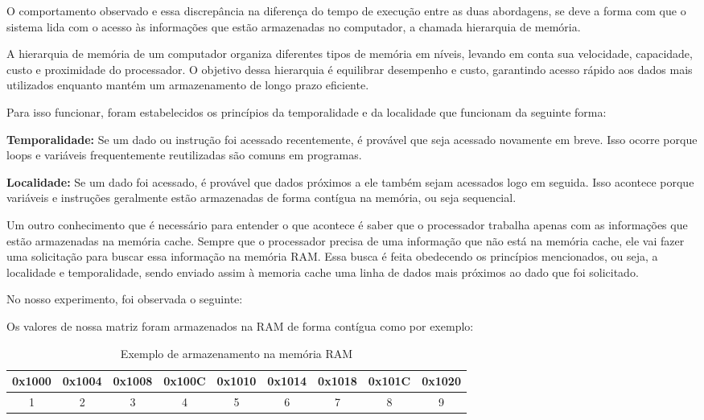 \documentclass[a4paper, 12pt]{article}
\begin{document}
	O comportamento observado e essa discrepância na diferença do tempo de execução entre as duas abordagens, se deve a forma com que o sistema lida com o acesso às informações que estão armazenadas no computador, a chamada hierarquia de memória.
	
	A hierarquia de memória de um computador organiza diferentes tipos de memória em níveis, levando em conta sua velocidade, capacidade, custo e proximidade do processador. O objetivo dessa hierarquia é equilibrar desempenho e custo, garantindo acesso rápido aos dados mais utilizados enquanto mantém um armazenamento de longo prazo eficiente.
	
	Para isso funcionar, foram estabelecidos os princípios da temporalidade e da localidade que funcionam da seguinte forma:
	
	
	\textbf{Temporalidade:} Se um dado ou instrução foi acessado recentemente, é provável que seja acessado novamente em breve. Isso ocorre porque loops e variáveis frequentemente reutilizadas são comuns em programas.
	
	\textbf{Localidade:} Se um dado foi acessado, é provável que dados próximos a ele também sejam acessados logo em seguida. Isso acontece porque variáveis e instruções geralmente estão armazenadas de forma contígua na memória, ou seja sequencial.
	
	
	Um outro conhecimento que é necessário para entender o que acontece é saber que o processador trabalha apenas com as informações que estão armazenadas na memória cache. Sempre que o processador precisa de uma informação que não está na memória cache, ele vai fazer uma solicitação para buscar essa informação na memória RAM. Essa busca é feita obedecendo os princípios mencionados, ou seja, a localidade e temporalidade, sendo enviado assim à memoria cache uma linha de dados mais próximos ao dado que foi solicitado.
	
	\vspace{0,5cm}
	
	No nosso experimento, foi observada o seguinte:
	
	\vspace{0,5cm}
	
	Os valores de nossa matriz foram armazenados na RAM de forma contígua como por exemplo:
	
	\begin{table}[ht]
	\centering
	    \begin{tabular}{|c|c|c|c|c|c|c|c|c|}
			\hline
			0x1000 & 0x1004 & 0x1008 & 0x100C & 0x1010 & 0x1014 & 0x1018 & 0x101C & 0x1020 \\
			\hline
			1      & 2      & 3      & 4      & 5      & 6      & 7      & 8      & 9      \\
			\hline
		\end{tabular}
	\caption{Exemplo de armazenamento na memória RAM}
	\end{table}
	
\end{document}
